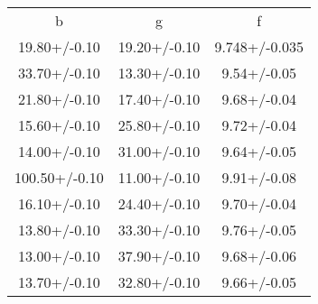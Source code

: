 \begin{table}
\begin{tabular}{ccc}
b & g & f \\
19.80+/-0.10 & 19.20+/-0.10 & 9.748+/-0.035 \\
33.70+/-0.10 & 13.30+/-0.10 & 9.54+/-0.05 \\
21.80+/-0.10 & 17.40+/-0.10 & 9.68+/-0.04 \\
15.60+/-0.10 & 25.80+/-0.10 & 9.72+/-0.04 \\
14.00+/-0.10 & 31.00+/-0.10 & 9.64+/-0.05 \\
100.50+/-0.10 & 11.00+/-0.10 & 9.91+/-0.08 \\
16.10+/-0.10 & 24.40+/-0.10 & 9.70+/-0.04 \\
13.80+/-0.10 & 33.30+/-0.10 & 9.76+/-0.05 \\
13.00+/-0.10 & 37.90+/-0.10 & 9.68+/-0.06 \\
13.70+/-0.10 & 32.80+/-0.10 & 9.66+/-0.05 \\
\end{tabular}
\end{table}
